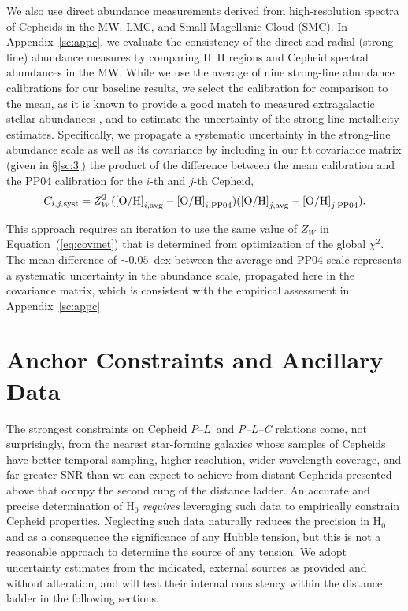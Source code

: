 \documentclass[12pt]{aastex631}
\newcommand{\bq}{\begin{equation}}
\newcommand{\eq}{\end{equation}}
\newcommand{\PLs}{$P$--$L$\ }
\begin{document}
We also use direct abundance measurements derived from high-resolution spectra of Cepheids in the MW, LMC, and Small Magellanic Cloud (SMC).  In Appendix~\ref{sc:appc}, we evaluate the consistency of the direct and radial (strong-line) abundance measures by comparing H~II regions and Cepheid spectral abundances in the MW.  While we use the average of nine strong-line abundance calibrations for our baseline results, we select the \citet[][hereafter PP04]{Pettini:2004} calibration for comparison to the mean, as it is known to provide a good match to measured extragalactic stellar abundances \citep[][and F.~Bresolin, priv.~comm.]{Bresolin:2016}, and to estimate the uncertainty of the strong-line metallicity estimates.  Specifically, we propagate a systematic uncertainty in the strong-line abundance scale as well as its covariance by including in our fit covariance matrix (given in \S\ref{sc:3}) the product of the difference between the mean calibration and the PP04 calibration for the $i$-th and $j$-th Cepheid,
\bq  C_{i,j,{\rm syst}} =Z_W^2(\textrm{[O/H]}_{i,\textrm{avg}}-\textrm{[O/H]}_{i,\textrm{PP04}})(\textrm{[O/H]}_{j,\textrm{avg}}-\textrm{[O/H]}_{j,\textrm{PP04}}). \label{eq:covmet} \eq 

This approach requires an iteration to use the same value of $Z_W$ in Equation~(\ref{eq:covmet}) that is determined from optimization of the global $\chi^2$. The mean difference of $\sim 0.05$~dex between the average and PP04 scale represents a systematic uncertainty in the abundance scale, propagated here in the covariance matrix, which is consistent with the empirical assessment in Appendix~\ref{sc:appc} 

\section{Anchor Constraints and Ancillary Data\label{sc:4}}

The strongest constraints on Cepheid \PLs and {\it P--L--C} relations come, not surprisingly, from the nearest star-forming galaxies whose samples of Cepheids have better temporal sampling, higher resolution, wider wavelength coverage, and far greater SNR than we can expect to achieve from distant Cepheids presented above that occupy the second rung of the distance ladder.  An accurate and precise determination of H$_0$ {\it requires} leveraging such data to empirically constrain Cepheid properties. Neglecting such data naturally reduces the precision in H$_0$ and as a consequence the significance of any Hubble tension, but this is not a reasonable approach to determine the source of any tension.   We adopt uncertainty estimates from the indicated, external sources as provided and without alteration, and will test their internal consistency within the distance ladder in the following sections.
\end{document}
